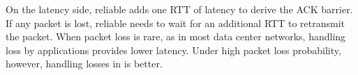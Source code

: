 On the latency side, reliable \sys adds one RTT of latency to derive the ACK barrier. If any packet is lost, reliable \sys needs to wait for an additional RTT to retransmit the packet. When packet loss is rare, as in most data center networks, handling loss by applications provides lower latency. Under high packet loss probability, however, handling losses in \sys is better.

